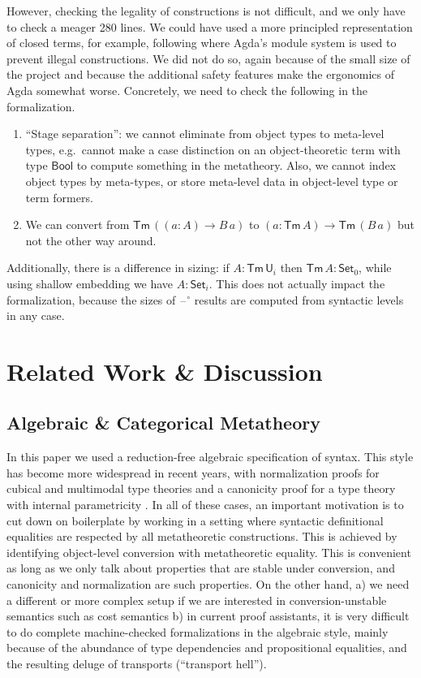 \documentclass[acmsmall,screen,review,anonymous]{acmart}
\newcommand{\msf}[1]{{\mathsf{#1}}}
\newcommand{\U}{\msf{U}}
\newcommand{\Set}{\msf{Set}}
\newcommand{\blank}{{\mathord{\hspace{1pt}\text{--}\hspace{1pt}}}}
\newcommand{\Bool}{\msf{Bool}}
\newcommand{\Tm}{\msf{Tm}}
\newcommand{\w}{\circ}
\begin{document}
However, checking the legality of constructions is not difficult, and we only have to check a meager
280 lines. We could have used a more principled representation of closed terms, for example,
following \citet{DBLP:conf/mpc/KaposiKK19} where Agda's module system is used to prevent illegal
constructions. We did not do so, again because of the small size of the project and because the
additional safety features make the ergonomics of Agda somewhat worse. Concretely, we need to check
the following in the formalization.
\begin{enumerate}
\item ``Stage separation'': we cannot eliminate from object types to meta-level types, e.g.\ cannot make a case distinction
      on an object-theoretic term with type $\Bool$ to compute something in the metatheory. Also, we cannot index
      object types by meta-types, or store meta-level data in object-level type or term formers.
\item We can convert from $\Tm\,((a : A) \to B\,a)$ to $(a : \Tm\,A) \to \Tm\,(B\,a)$ but not the other way around.
\end{enumerate}
Additionally, there is a difference in sizing: if $A : \Tm\,\U_i$ then $\Tm\,A : \Set_0$, while
using shallow embedding we have $A : \Set_i$. This does not actually impact the formalization,
because the sizes of $\blank^\w$ results are computed from syntactic levels in any case.

\section{Related Work \& Discussion}

\subsection{Algebraic \& Categorical Metatheory}

In this paper we used a reduction-free algebraic specification of syntax.  This style has become
more widespread in recent years, with normalization proofs for cubical \cite{ctt-normalization} and
multimodal type theories \cite{DBLP:conf/lics/Gratzer22} and a canonicity proof for a type theory
with internal parametricity \cite{altenkirch2024internal}. In all of these cases, an important
motivation is to cut down on boilerplate by working in a setting where syntactic definitional
equalities are respected by all metatheoretic constructions. This is achieved by identifying
object-level conversion with metatheoretic equality. This is convenient as long as we only talk
about properties that are stable under conversion, and canonicity and normalization are such
properties. On the other hand, a) we need a different or more complex setup if we are interested in
conversion-unstable semantics such as cost semantics b) in current proof assistants, it is very
difficult to do complete machine-checked formalizations in the algebraic style, mainly because of
the abundance of type dependencies and propositional equalities, and the resulting deluge of
transports (``transport hell'').
\end{document}
